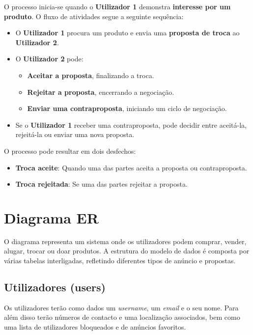 \documentclass[a4paper, 12pt]{article} %
\begin{document}
O processo inicia-se quando o \textbf{Utilizador 1} demonstra \textbf{interesse por um produto}. O fluxo de atividades segue a seguinte sequência:

\begin{itemize}
	\item O \textbf{Utilizador 1} procura um produto e envia uma \textbf{proposta de troca} ao \textbf{Utilizador 2}.
	\item O \textbf{Utilizador 2} pode:
	\begin{itemize}
		\item \textbf{Aceitar a proposta}, finalizando a troca.
		\item \textbf{Rejeitar a proposta}, encerrando a negociação.
		\item \textbf{Enviar uma contraproposta}, iniciando um ciclo de negociação.
	\end{itemize}
	\item Se o \textbf{Utilizador 1} receber uma contraproposta, pode decidir entre aceitá-la, rejeitá-la ou enviar uma nova proposta.
\end{itemize}

O processo pode resultar em dois desfechos:
\begin{itemize}
	\item \textbf{Troca aceite}: Quando uma das partes aceita a proposta ou contraproposta.
	\item \textbf{Troca rejeitada}: Se uma das partes rejeitar a proposta.
\end{itemize}
\newpage
\section{Diagrama ER}

O diagrama representa um sistema onde os utilizadores podem comprar, vender, alugar, trocar ou doar produtos. A estrutura do modelo de dados é composta por várias tabelas interligadas, refletindo diferentes tipos de anúncio e propostas.


\subsection{\textbf{Utilizadores (users)}}
Os utilizadores terão como dados um \textit{username}, um \textit{email} e o seu nome. Para além disso terão números de contacto e uma localização associados, bem como uma lista de utilizadores bloqueados e de anúncios favoritos.
\end{document}
